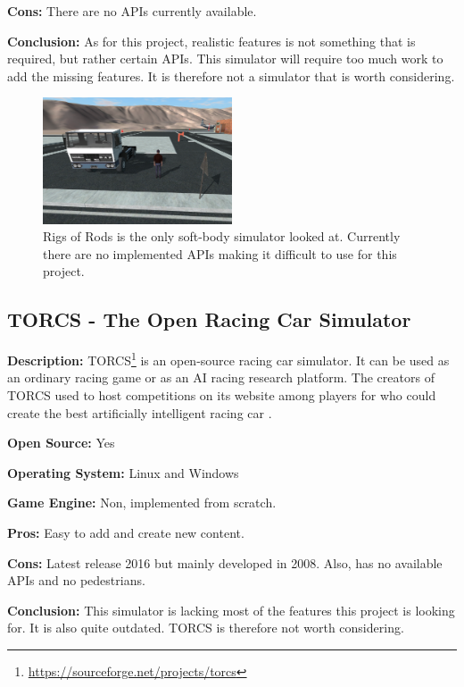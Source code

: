 \textbf{Cons:} There are no APIs currently available. 

\textbf{Conclusion:} As for this project, realistic features is not something that is required, but rather certain APIs. This simulator will require too much work to add the missing features. It is therefore not a simulator that is worth considering. 

\begin{figure}[H]
    \centering
    \includegraphics[width=0.5\textwidth]{03_Background/Appendix/Simulators/RoR.png}
    \caption{Rigs of Rods is the only soft-body simulator looked at. Currently there are no implemented APIs making it difficult to use for this project.}
\end{figure}


\subsection{TORCS - The Open Racing Car Simulator}
\textbf{Description:} TORCS\footnote{\url{https://sourceforge.net/projects/torcs}} is an open-source racing car simulator. It can be used as an ordinary racing game or as an AI racing research platform. The creators of TORCS used to host competitions on its website among players for who could create the best artificially intelligent racing car \cite{TORCS_Racing}. 

\textbf{Open Source:} Yes

\textbf{Operating System:} Linux and Windows

\textbf{Game Engine:} Non, implemented from scratch.

\textbf{Pros:} Easy to add and create new content. 

\textbf{Cons:} Latest release 2016 but mainly developed in 2008. Also, has no available APIs and no pedestrians.

\textbf{Conclusion:} This simulator is lacking most of the features this project is looking for. It is also quite outdated. TORCS is therefore not worth considering. 

